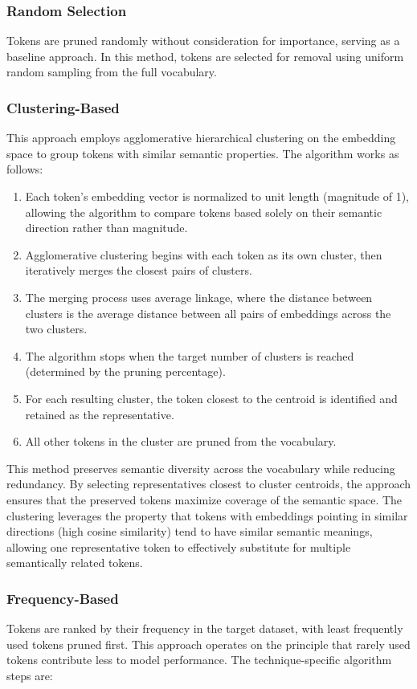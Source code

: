 \documentclass[twocolumn]{article}
\begin{document}
\subsubsection{Random Selection}
Tokens are pruned randomly without consideration for importance, serving as a baseline approach. In this method, tokens are selected for removal using uniform random sampling from the full vocabulary.

\subsubsection{Clustering-Based}
This approach employs agglomerative hierarchical clustering on the embedding space to group tokens with similar semantic properties. The algorithm works as follows:

\begin{enumerate}
    \item Each token's embedding vector is normalized to unit length (magnitude of 1), allowing the algorithm to compare tokens based solely on their semantic direction rather than magnitude.
    \item Agglomerative clustering begins with each token as its own cluster, then iteratively merges the closest pairs of clusters.
    \item The merging process uses average linkage, where the distance between clusters is the average distance between all pairs of embeddings across the two clusters.
    \item The algorithm stops when the target number of clusters is reached (determined by the pruning percentage).
    \item For each resulting cluster, the token closest to the centroid is identified and retained as the representative.
    \item All other tokens in the cluster are pruned from the vocabulary.
\end{enumerate}
This method preserves semantic diversity across the vocabulary while reducing redundancy. By selecting representatives closest to cluster centroids, the approach ensures that the preserved tokens maximize coverage of the semantic space. The clustering leverages the property that tokens with embeddings pointing in similar directions (high cosine similarity) tend to have similar semantic meanings, allowing one representative token to effectively substitute for multiple semantically related tokens.

\subsubsection{Frequency-Based}
Tokens are ranked by their frequency in the target dataset, with least frequently used tokens pruned first. This approach operates on the principle that rarely used tokens contribute less to model performance. The technique-specific algorithm steps are:
\end{document}
